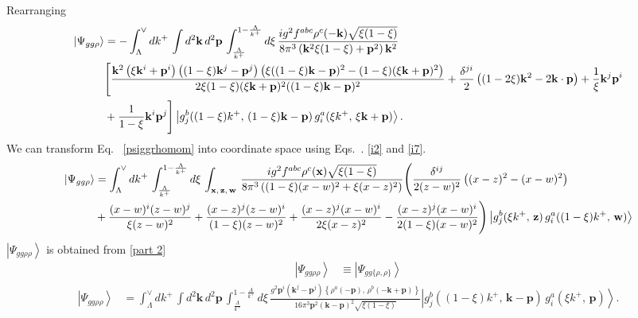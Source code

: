 \documentclass[aps,prd,amsmath,amssymb,nofootinbib]{revtex4-2}
\numberwithin{equation}{section}
\begin{document}
Rearranging
\begin{align}\label{psiggrhomomre}
    \left|\Psi_{gg\rho}\right\rangle  & = -\int_{\Lambda}^{\vee}dk^{+}\,\int d^{2}\mathbf{k}\, d^{2}\mathbf{p}\,\int_{\frac{\Lambda}{k^{+}}}^{1-\frac{\Lambda}{k^{+}}}d\xi\,\frac{ig^{2}f^{abc}\rho^{c}(-\mathbf{k})\sqrt{\xi(1-\xi)}}{8\pi^{3}\left(\mathbf{k}^{2}\xi(1-\xi)+\mathbf{p}^{2}\right)\mathbf{k}^{2}}\notag \\
&\Bigg[\frac{\mathbf{k}^{2}\left(\xi \mathbf{k}^{i}+\mathbf{p}^{i}\right)\left((1-\xi)\mathbf{k}^{j}-\mathbf{p}^{j}\right)\left(\xi((1-\xi)\mathbf{k}-\mathbf{p})^{2}-(1-\xi)(\xi \mathbf{k}+\mathbf{p})^{2}\right)}{2\xi(1-\xi)(\xi \mathbf{k}+\mathbf{p})^{2}((1-\xi)\mathbf{k}-\mathbf{p})^{2}}+\frac{\delta^{ji}}{2}\left((1-2\xi)\mathbf{k}^{2}-2\mathbf{k}\cdot\mathbf{p}\right)+\frac{1}{\xi}\mathbf{k}^{j}\mathbf{p}^{i}\notag \\ & +\frac{1}{1-\xi}\mathbf{k}^{i}\mathbf{p}^{j}\Bigg] \left|g_{j}^{b}((1-\xi)k^{+},\,(1-\xi)\mathbf{k}-\mathbf{p})\, g_{i}^{a}(\xi k^{+},\,\xi\mathbf{k}+\mathbf{p})\right\rangle.
\end{align}
We can transform Eq.~ \eqref{psiggrhomom} into coordinate space using Eqs.~. \eqref{i2} and \eqref{i7}.
\begin{align}\label{ggrhopos}
 \left|\Psi_{gg\rho}\right\rangle  & = \int_{\Lambda}^{\vee}dk^{+}\,\int_{\frac{\Lambda}{k^{+}}}^{1-\frac{\Lambda}{k^{+}}}d\xi\,\int_{\mathbf{x},\, \mathbf{z},\, \mathbf{w}}\,\frac{ig^{2}f^{abc}\rho^{c}(\mathbf{x})\sqrt{\xi(1-\xi)}}{8\pi^{3}\left((1-\xi)(x-w)^{2}+\xi (x-z)^{2}\right)}\Bigg(\frac{\delta^{ij}}{2(z-w)^{2}}\left((x-z)^{2}-(x-w)^{2}\right)\notag \\ & +\frac{(x-w)^{i}(z-w)^{j}}{\xi (z-w)^{2}}+\frac{(x-z)^{j}(z-w)^{i}}{(1-\xi)(z-w)^{2}}+\frac{(x-z)^{j}(x-w)^{i}}{2\xi (x-z)^{2}} -\frac{(x-z)^{j}(x-w)^{i}}{2(1-\xi)(x-w)^{2}}\Bigg)\left|g_{j}^{b}(\xi k^{+},\,\mathbf{z})\, g_{i}^{a}((1-\xi)k^{+},\,\mathbf{w})\right\rangle
\end{align}
$\left|\Psi_{gg\rho\rho}\right\rangle$ is obtained from \eqref{part 2}
\begin{align}
    \left|\Psi_{gg\rho\rho}\right\rangle & \equiv \left|\Psi_{gg\{\rho,\rho\}}\right\rangle
\end{align}
\begin{align}\label{ggrhorhomom}
\left|\Psi_{gg\rho\rho}\right\rangle & = \int_{\Lambda}^{\vee}dk^{+}\,\int d^{2}\mathbf{k}\, d^{2}\mathbf{p}\,\int_{\frac{\Lambda}{k^{+}}}^{1-\frac{\Lambda}{k^{+}}}d\xi\,\frac{g^{2}\mathbf{p}^{i}\left(\mathbf{k}^{j}-\mathbf{p}^{j}\right)\left\{ \rho^{a}(-\mathbf{p}),\,\rho^{b}(-\mathbf{k}+\mathbf{p})\right\} }{16\pi^{3}\mathbf{p}^{2}(\mathbf{k}-\mathbf{p})^{2}\sqrt{\xi(1-\xi)}}  \left|g_{j}^{b}((1-\xi)k^{+},\,\mathbf{k}-\mathbf{p})\,g_{i}^{a}(\xi k^{+},\,\mathbf{p})\right\rangle.
\end{align}
\end{document}
